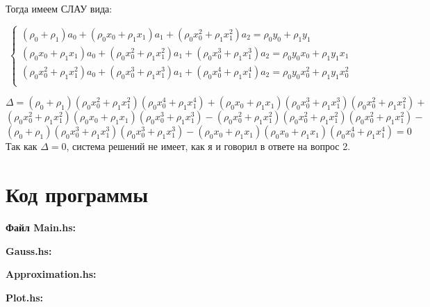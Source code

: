 \documentclass[a4paper,12pt]{article}
\begin{document}
\noindent\textbf{}Тогда имеем СЛАУ вида:

\begin{equation*}
	\begin{cases}
		(\rho_{0}+\rho_{1})a_{0} + (\rho_{0}x_{0} + \rho_{1}x_{1})a_{1} + (\rho_{0}x_{0}^2 + \rho_{1}x_{1}^2)a_{2} = \rho_{0}y_{0} + \rho_{1}y_{1}\\
		
		(\rho_{0}x_{0} + \rho_{1}x_{1})a_{0} + (\rho_{0}x_{0}^2 + \rho_{1}x_{1}^2)a_{1} + (\rho_{0}x_{0}^3 + \rho_{1}x_{1}^3)a_{2} = \rho_{0}y_{0}x_{0} + \rho_{1}y_{1}x_{1}\\
		
		(\rho_{0}x_{0}^2 + \rho_{1}x_{1}^2)a_{0} + (\rho_{0}x_{0}^3 + \rho_{1}x_{1}^3)a_{1} + (\rho_{0}x_{0}^4 + \rho_{1}x_{1}^4)a_{2} = \rho_{0}y_{0}x_{0}^2 + \rho_{1}y_{1}x_{0}^2\\
	\end{cases}
\end{equation*}

$$ \Delta = (\rho_{0}+\rho_{1})(\rho_{0}x_{0}^2 + \rho_{1}x_{1}^2)(\rho_{0}x_{0}^4 + \rho_{1}x_{1}^4) + (\rho_{0}x_{0} + \rho_{1}x_{1})(\rho_{0}x_{0}^3 + 
 \rho_{1}x_{1}^3)(\rho_{0}x_{0}^2 + \rho_{1}x_{1}^2) + $$
 $$(\rho_{0}x_{0}^2 + \rho_{1}x_{1}^2)(\rho_{0}x_{0} + \rho_{1}x_{1})(\rho_{0}x_{0}^3 + \rho_{1}x_{1}^3) - (\rho_{0}x_{0}^2 + \rho_{1}x_{1}^2)(\rho_{0}x_{0}^2 + \rho_{1}x_{1}^2)(\rho_{0}x_{0}^2 + \rho_{1}x_{1}^2) - $$
  $$(\rho_{0}+\rho_{1})(\rho_{0}x_{0}^3 + \rho_{1}x_{1}^3)(\rho_{0}x_{0}^3 + \rho_{1}x_{1}^3) - (\rho_{0}x_{0} + \rho_{1}x_{1})(\rho_{0}x_{0} + \rho_{1}x_{1})(\rho_{0}x_{0}^4 + \rho_{1}x_{1}^4) = 0$$\newline
\noindent\textbf{}Так как $\Delta = 0$, система решений не имеет, как я и говорил в ответе на вопрос 2.\newline

\clearpage
\section{Код программы}
\noindent\textbf{Файл Main.hs:}


\noindent\textbf{ Gauss.hs:}


\noindent\textbf{ Approximation.hs:}


\noindent\textbf{ Plot.hs:}

\end{document}
